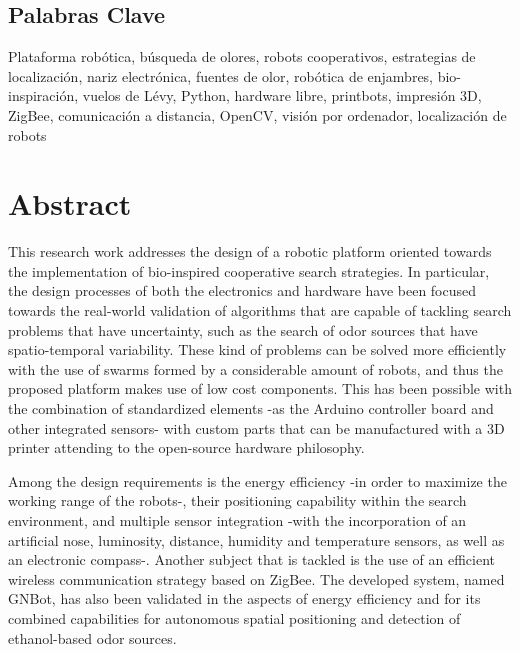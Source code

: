 \vspace*{-0.2cm}
\section*{Palabras Clave}
\vspace*{-0.2cm}
Plataforma rob\'{o}tica, b\'{u}squeda de olores, robots cooperativos, estrategias de localizaci\'{o}n, nariz electr\'{o}nica, fuentes de olor, rob\'{o}tica de enjambres, bio-inspiraci\'{o}n, vuelos de L\'{e}vy, Python, hardware libre, printbots, impresi\'{o}n 3D, ZigBee, comunicaci\'{o}n a distancia, OpenCV, visi\'{o}n por ordenador, localizaci\'{o}n de robots

\chapter*{Abstract}
\vspace*{-1cm}










This research work addresses the design of a robotic platform oriented towards the implementation of bio-inspired cooperative search strategies.
In particular, the design processes of both the electronics and hardware have been focused towards the real-world validation of algorithms that are capable of tackling search problems that have uncertainty, such as the search of odor sources that have spatio-temporal variability.
These kind of problems can be solved more efficiently with the use of swarms formed by a considerable amount of robots, and thus the proposed platform makes use of low cost components.
This has been possible with the combination of standardized elements -as the Arduino controller board and other integrated sensors- with custom parts that can be manufactured with a 3D printer attending to the open-source hardware philosophy.

Among the design requirements is the energy efficiency -in order to maximize the working range of the robots-, their positioning capability within the search environment, and multiple sensor integration -with the incorporation of an artificial nose, luminosity, distance, humidity and temperature sensors, as well as an electronic compass-.
Another subject that is tackled is the use of an efficient wireless communication strategy based on ZigBee.
The developed system, named GNBot, has also been validated in the aspects of energy efficiency and for its combined capabilities for autonomous spatial positioning and detection of ethanol-based odor sources.


